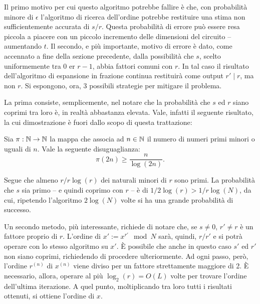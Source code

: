 Il primo motivo per cui questo algoritmo potrebbe fallire è che, con probabilità minore di $\epsilon$ l'algoritmo di ricerca dell'ordine potrebbe restituire una stima non sufficientemente accurata di $s/r$. 
Questa probabilità di errore può essere resa piccola a piacere con un piccolo incremento delle dimensioni del circuito -- aumentando $t$.
Il secondo, e più importante, motivo di errore è dato, come accennato a fine della sezione precedente, dalla possibilità che $s$, scelto uniformemente tra $0$ er $r-1$, abbia fattori comuni con $r$. 
In tal caso il risultato dell'algoritmo di espansione in frazione continua restituirà come output $r' \mid r$, ma non $r$.
Si espongono, ora, 3 possibili strategie per mitigare il problema.

La prima consiste, semplicemente, nel notare che la probabilità che $s$ ed $r$ siano coprimi tra loro è, in realtà abbastanza elevata. Vale, infatti il seguente risultato, la cui dimostrazione è fuori dallo scopo di questa trattazione:
\begin{thm}\label{thm:Prime_extimate}
 Sia $\pi: \mathbb{N} \to \mathbb{N}$ la mappa che associa ad $n \in \mathbb{N}$ il numero di numeri primi minori o uguali di $n$. Vale la seguente disuguaglianza:
 \begin{equation}
  \pi(2n) \geq \frac{n}{\log(2n)}.
 \end{equation}
\end{thm}
Segue che almeno $r/r\log(r)$ dei naturali minori di $r$ sono primi. La probabilità che $s$ sia primo -- e quindi coprimo con $r$ -- è di $1/2\log(r) > 1/r\log(N)$, da cui, ripetendo l'algoritmo $2\log(N)$ volte si ha una grande probabilità di successo.

Un secondo metodo, più interessante, richiede di notare che, se $s \neq 0$, $r' \neq r$ è un fattore proprio di $r$. 
L'ordine di $x' := x^{r'} \mod N$ sarà, quindi, $r/r'$ e si potrà operare con lo stesso algoritmo su $x'$. 
È possibile che anche in questo caso $s'$ ed $r'$ non siano coprimi, richiedendo di procedere ulteriormente. 
Ad ogni passo, però, l'ordine $r^{(n)}$ di $x^{(n)}$ viene diviso per un fattore strettamente maggiore di 2. 
È necessario, allora, operare al più $\log_2(r) = O(L)$ volte per trovare l'ordine dell'ultima iterazione.
A quel punto, moltiplicando tra loro tutti i risultati ottenuti, si ottiene l'ordine di $x$.

